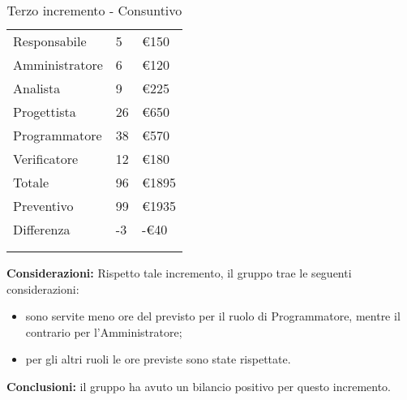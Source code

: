 {{\begin{longtable}{C{.4\freewidth} C{.2\freewidth} C{.2\freewidth}}
      Responsabile & 5 & €150 \\
      Amministratore & 6 & €120 \\
      Analista & 9 & €225 \\
      Progettista & 26 & €650 \\
      Programmatore & 38 & €570 \\
      Verificatore & 12 & €180 \\
      Totale & 96 & €1895 \\
      Preventivo & 99 & €1935 \\
      Differenza & -3 & -€40  \\
      \bottomrule
      \\
      \caption{Terzo incremento - Consuntivo}

      \end{longtable} 
      
      \textbf{Considerazioni:} 
        Rispetto tale incremento, il gruppo trae le seguenti considerazioni:
        \begin{itemize}
            \item sono servite meno ore del previsto per il ruolo di Programmatore, mentre il contrario per l'Amministratore;
            \item per gli altri ruoli le ore previste sono state rispettate.
        \end{itemize}

        \textbf{Conclusioni:} il gruppo ha avuto un bilancio positivo per questo incremento. 
    }
 }
